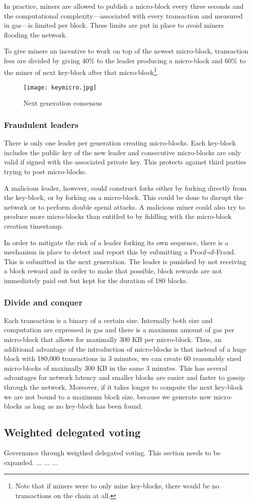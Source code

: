 In practice, miners are allowed to publish a micro-block every three seconds
and the computational complexity---associated with every transaction and
measured in gas---is limited per block. These limits are put in place to avoid
miners flooding the network.

To give miners an incentive to work on top of the newest micro-block,
transaction fees are divided by giving 40\% to the leader producing a
micro-block and 60\% to the miner of next key-block after that
micro-block\footnote{Note that if miners
  were to only mine key-blocks, there would be no transactions on the
  chain at all.}.

\begin{figure}
   \texttt{[image: keymicro.jpg]}
   \caption{Next generation consensus}
   \label{ng-mining}
\end{figure}

\subsubsection{Fraudulent leaders}

There is only one leader per generation creating micro-blocks. Each key-block
includes the public key of the new leader and consecutive micro-blocks are
only valid if signed with the associated private key. This protects
against third parties trying to post micro-blocks.

A malicious leader, however, could construct forks either by forking directly
from the key-block, or by forking on a micro-block. This could be done to
disrupt the network or to perform double spend attacks. A malicious miner could
also try to produce more micro-blocks than entitled to by fiddling with the
micro-block creation timestamp.

In order to mitigate the risk of a leader forking its own sequence,
there is a mechanism in place to detect and report this by submitting
a Proof-of-Fraud. This is submitted in the next
generation. The leader is punished by not receiving a block reward and
in order to make that possible, block rewards are not immediately paid out but
kept for the duration of 180 blocks.

\subsubsection{Divide and conquer}

Each transaction is a binary of a certain size. Internally both size
and computation are expressed in gas and there is a maximum amount of
gas per micro-block that allows for maximally 300 KB per micro-block.
Thus, an additional advantage of the introduction of micro-blocks is that
instead of a huge block with 180,000 transactions in 3 minutes, we can create
60
reasonably sized micro-blocks of maximally 300 KB  in the same 3
minutes. This has several advantages for network latency and
smaller blocks are easier and faster to gossip through the
network. Moreover, if it takes longer to compute the next key-block we
are not bound to a maximum block size, because we generate new
micro-blocks as long as no key-block has been found.

\subsection{Weighted delegated voting}
Governance through weigthed delegated voting. This section needs to be expanded.
...
...
...